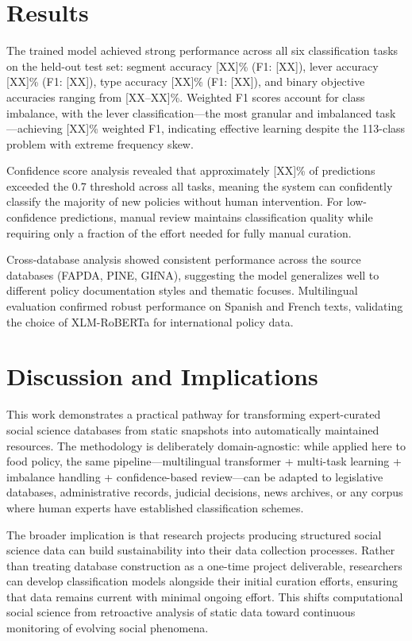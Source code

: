 \documentclass[a4paper,12pt]{article}
\begin{document}
\section*{Results}

The trained model achieved strong performance across all six classification tasks on the held-out test set: segment accuracy [XX]\% (F1: [XX]), lever accuracy [XX]\% (F1: [XX]), type accuracy [XX]\% (F1: [XX]), and binary objective accuracies ranging from [XX--XX]\%. Weighted F1 scores account for class imbalance, with the lever classification---the most granular and imbalanced task---achieving [XX]\% weighted F1, indicating effective learning despite the 113-class problem with extreme frequency skew.

Confidence score analysis revealed that approximately [XX]\% of predictions exceeded the 0.7 threshold across all tasks, meaning the system can confidently classify the majority of new policies without human intervention. For low-confidence predictions, manual review maintains classification quality while requiring only a fraction of the effort needed for fully manual curation.

Cross-database analysis showed consistent performance across the source databases (FAPDA, PINE, GIfNA), suggesting the model generalizes well to different policy documentation styles and thematic focuses. Multilingual evaluation confirmed robust performance on Spanish and French texts, validating the choice of XLM-RoBERTa for international policy data.

\section*{Discussion and Implications}

This work demonstrates a practical pathway for transforming expert-curated social science databases from static snapshots into automatically maintained resources. The methodology is deliberately domain-agnostic: while applied here to food policy, the same pipeline---multilingual transformer + multi-task learning + imbalance handling + confidence-based review---can be adapted to legislative databases, administrative records, judicial decisions, news archives, or any corpus where human experts have established classification schemes.

The broader implication is that research projects producing structured social science data can build sustainability into their data collection processes. Rather than treating database construction as a one-time project deliverable, researchers can develop classification models alongside their initial curation efforts, ensuring that data remains current with minimal ongoing effort. This shifts computational social science from retroactive analysis of static data toward continuous monitoring of evolving social phenomena.
\end{document}
